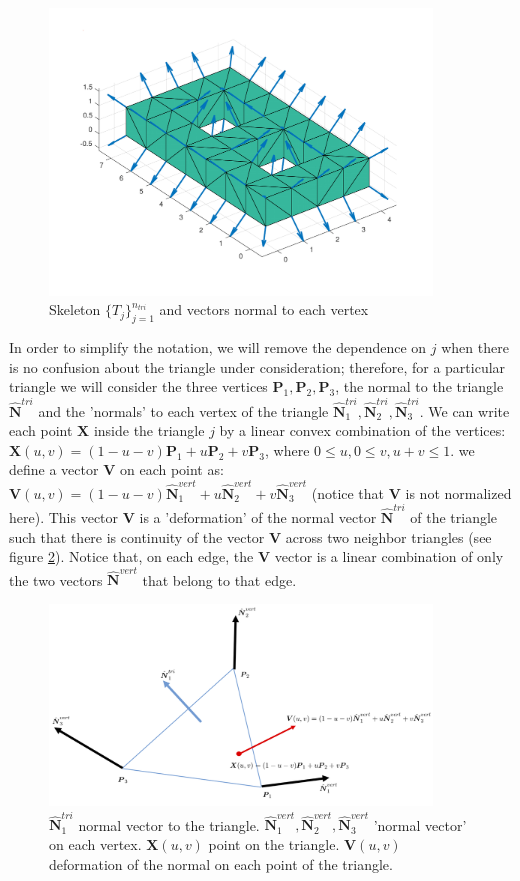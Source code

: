 \documentclass[11pt]{article}
\newcommand\bP{\boldsymbol P}
\newcommand\bN{\boldsymbol N}
\newcommand\bX{\boldsymbol X}
\newcommand\bV{\boldsymbol V}
\begin{document}
\begin{figure}[H]
\begin{center}
\includegraphics[width=4in]{normal_vert_genus_2.pdf}%
\end{center}
\caption{Skeleton $\{\mathit{T}_j\}_{j=1}^{n_{tri}}$ and vectors normal to each vertex}
\label{normalvert3}
\end{figure}

In order to simplify the notation, we will remove the dependence on $j$ when there is no confusion about the triangle under consideration; therefore, for a particular triangle  we will consider the three vertices $\bP_1,\bP_2,\bP_3$, the normal to the triangle $\hat{\bN}^{tri}$ and the 'normals' to each vertex of the triangle $\hat{\bN}_1^{tri},\hat{\bN}_2^{tri},\hat{\bN}_3^{tri}$. We can write each point $\bX$ inside the triangle $j$ by a linear convex combination of the vertices: $\bX(u,v)=(1-u-v)\bP_1+u\bP_2+v\bP_3$, where $0\le u, 0\le v, u+v\le1$. we define a vector $\bV$ on each point as: $\bV(u,v)=(1-u-v)\hat{\bN}_1^{vert}+u\hat{\bN}_2^{vert}+v\hat{\bN}_3^{vert}$ (notice that $\bV$ is not normalized here). This vector $\bV$ is a 'deformation' of the normal vector $\hat{\bN}^{tri}$ of the triangle such that there is continuity of the vector $\bV$ across two neighbor triangles (see figure \ref{normalvert3}). Notice that, on each edge, the $\bV$ vector is a linear combination of only the two vectors $\hat{\bN}^{vert}$  that belong to that edge.

\begin{figure}[H]
\begin{center}
\includegraphics[width=4in]{normal_vertex_3.png}%
\end{center}
\caption{$\hat{\bN}_1^{tri}$ normal vector to the triangle. $\hat{\bN}_1^{vert},\hat{\bN}_2^{vert},\hat{\bN}_3^{vert}$ 'normal vector' on each vertex. $\bX(u,v)$ point on the triangle. $\bV(u,v)$ deformation of the normal on each point of the triangle.}
\label{normalvert3}
\end{figure}
\end{document}
